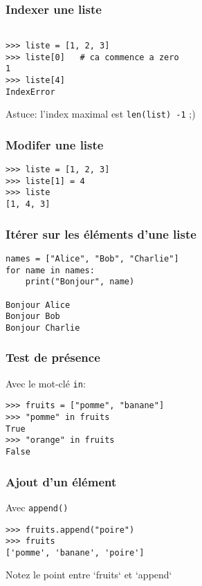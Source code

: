\documentclass{beamer}
\begin{document}
\begin{frame}[fragile]
  \frametitle{Indexer une liste}

\begin{lstlisting}

>>> liste = [1, 2, 3]
>>> liste[0]   # ca commence a zero
1
>>> liste[4]
IndexError
\end{lstlisting}

\vfill

Astuce: l'index maximal est \texttt{len(list) -1} ;)

\end{frame}

\begin{frame}[fragile]
  \frametitle{Modifer une liste}
\begin{lstlisting}
>>> liste = [1, 2, 3]
>>> liste[1] = 4
>>> liste
[1, 4, 3]
\end{lstlisting}

\end{frame}

\begin{frame}[fragile]
  \frametitle{Itérer sur les éléments d'une liste}
\begin{lstlisting}
names = ["Alice", "Bob", "Charlie"]
for name in names:
    print("Bonjour", name)

Bonjour Alice
Bonjour Bob
Bonjour Charlie
\end{lstlisting}

\end{frame}

\begin{frame}[fragile]
  \frametitle{Test de présence}

Avec le mot-clé \texttt{in}:

\vfill

\begin{lstlisting}
>>> fruits = ["pomme", "banane"]
>>> "pomme" in fruits
True
>>> "orange" in fruits
False
\end{lstlisting}

\end{frame}

\begin{frame}[fragile]
  \frametitle{Ajout d'un élément}
Avec \texttt{append()}

\begin{lstlisting}
>>> fruits.append("poire")
>>> fruits
['pomme', 'banane', 'poire']
\end{lstlisting}

\vfill

Notez le point entre `fruits` et `append`
\end{frame}
\end{document}
